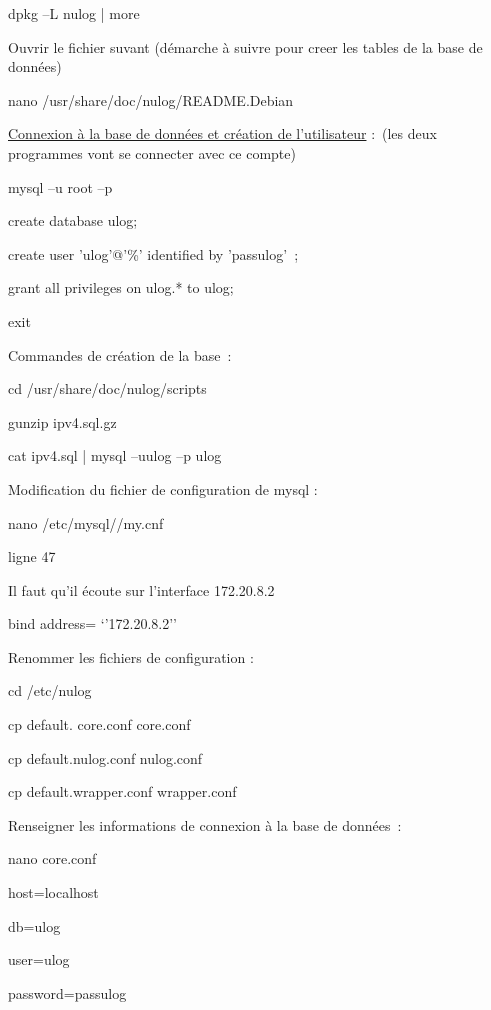\documentclass[12pt]{report}
\begin{document}
\begin{itemize}
dpkg –L nulog | more
\newline

Ouvrir le fichier suvant (démarche à suivre pour creer les tables de la base de données)
\newline

nano /usr/share/doc/nulog/README.Debian
\newline

\underline{Connexion à la base de données et création de l’utilisateur} : (les deux programmes vont se connecter avec ce compte)

mysql –u root –p

create database ulog;

create user 'ulog'@'\%' identified by 'passulog' ;

grant all privileges on ulog.* to ulog;

exit
\newline

Commandes de création de la base :

cd /usr/share/doc/nulog/scripts

gunzip ipv4.sql.gz

cat ipv4.sql | mysql –uulog –p ulog

\newline
Modification du fichier de configuration de mysql :

nano /etc/mysql//my.cnf

ligne 47
\newline

Il faut qu’il écoute sur l’interface 172.20.8.2

bind address= ‘’172.20.8.2’’
\newline

Renommer les fichiers de configuration :

cd /etc/nulog

cp default. core.conf core.conf

cp default.nulog.conf nulog.conf

cp default.wrapper.conf wrapper.conf

\newline

Renseigner les informations de connexion à la base de données :

nano core.conf

host=localhost

db=ulog

user=ulog

password=passulog


\end{itemize}
\end{document}
